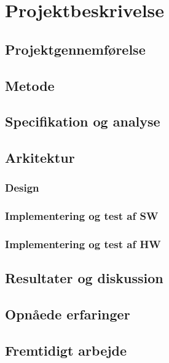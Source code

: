 \chapter{Projektbeskrivelse}

\section{Projektgennemførelse}

\section{Metode}

\section{Specifikation og analyse}

\section{Arkitektur}
\subsection{Design}
\subsection{Implementering og test af SW}
\subsection{Implementering og test af HW}

\section{Resultater og diskussion}

\section{Opnåede erfaringer}

\section{Fremtidigt arbejde}


